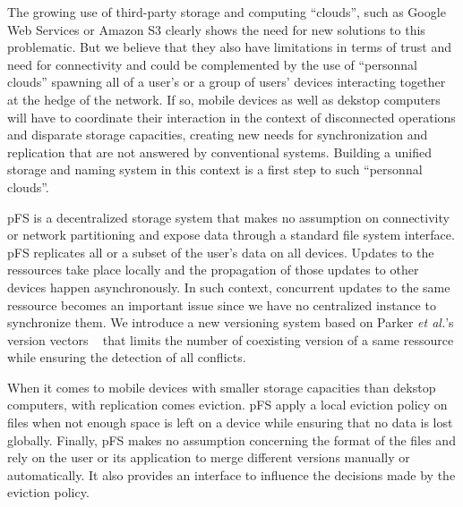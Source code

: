 The growing use of third-party storage and computing ``clouds'', such
as Google Web Services or Amazon S3 clearly shows the need for new
solutions to this problematic. But we believe that they also have
limitations in terms of trust and need for connectivity and could be
complemented by the use of ``personnal clouds'' spawning all of a
user's or a group of users' devices interacting together at the hedge
of the network. If so, mobile devices as well as dekstop computers
will have to coordinate their interaction in the context of
disconnected operations and disparate storage capacities, creating new
needs for synchronization and replication that are not answered by
conventional systems. Building a unified storage and naming system in
this context is a first step to such ``personnal clouds''.

pFS is a decentralized storage system that makes no assumption on
connectivity or network partitioning and expose data through a
standard file system interface. pFS replicates all or a
subset of the user's data on all devices. Updates to the ressources
take place locally and the propagation of those updates to other
devices happen asynchronously. In such context, concurrent updates to
the same ressource becomes an important issue since we have no
centralized instance to synchronize them. We introduce a new
versioning system based on Parker \emph{et al.}'s version vectors
~\cite{Parker1983} that limits the number of coexisting version of a
same ressource while ensuring the detection of all conflicts.

When it comes to mobile devices with smaller storage capacities than
dekstop computers, with replication comes eviction. pFS apply a local
eviction policy on files when not enough space is left on a device
while ensuring that no data is lost globally. Finally, pFS makes no
assumption concerning the format of the files and rely on the user or
its application to merge different versions manually or automatically.
It also provides an interface to influence the decisions made by the
eviction policy.

